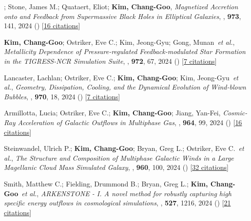 \item[{11.}]; Stone, James M.; Quataert, Eliot; \textbf{Kim, Chang-Goo}, \textit{Magnetized Accretion onto and Feedback from Supermassive Black Holes in Elliptical Galaxies}, , \textbf{973}, 141, 2024 () [\href{http://adsabs.harvard.edu/abs/2024ApJ...973..141G}{16 citations}]

\item[{10.}]\textbf{Kim, Chang-Goo}; Ostriker, Eve C.; Kim, Jeong-Gyu; Gong, Munan~\textit{et al.}, \textit{Metallicity Dependence of Pressure-regulated Feedback-modulated Star Formation in the TIGRESS-NCR Simulation Suite}, , \textbf{972}, 67, 2024 () [\href{http://adsabs.harvard.edu/abs/2024ApJ...972...67K}{7 citations}]

\item[{9.}]Lancaster, Lachlan; Ostriker, Eve C.; \textbf{Kim, Chang-Goo}; Kim, Jeong-Gyu~\textit{et al.}, \textit{Geometry, Dissipation, Cooling, and the Dynamical Evolution of Wind-blown Bubbles}, , \textbf{970}, 18, 2024 () [\href{http://adsabs.harvard.edu/abs/2024ApJ...970...18L}{7 citations}]

\item[{8.}]Armillotta, Lucia; Ostriker, Eve C.; \textbf{Kim, Chang-Goo}; Jiang, Yan-Fei, \textit{Cosmic-Ray Acceleration of Galactic Outflows in Multiphase Gas}, , \textbf{964}, 99, 2024 () [\href{http://adsabs.harvard.edu/abs/2024ApJ...964...99A}{16 citations}]

\item[{7.}]Steinwandel, Ulrich P.; \textbf{Kim, Chang-Goo}; Bryan, Greg L.; Ostriker, Eve C.~\textit{et al.}, \textit{The Structure and Composition of Multiphase Galactic Winds in a Large Magellanic Cloud Mass Simulated Galaxy}, , \textbf{960}, 100, 2024 () [\href{http://adsabs.harvard.edu/abs/2024ApJ...960..100S}{32 citations}]

\item[{6.}]Smith, Matthew C.; Fielding, Drummond B.; Bryan, Greg L.; \textbf{Kim, Chang-Goo}~\textit{et al.}, \textit{ARKENSTONE - I. A novel method for robustly capturing high specific energy outflows in cosmological simulations}, , \textbf{527}, 1216, 2024 () [\href{http://adsabs.harvard.edu/abs/2024MNRAS.527.1216S}{21 citations}]

